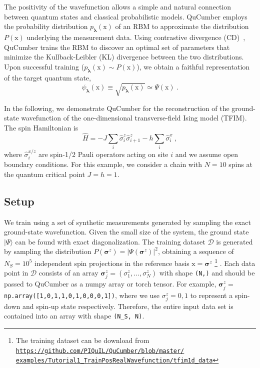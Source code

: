 \documentclass[submission, Phys, hidelnks]{SciPost}
\newcommand{\x}{\bm{\mathrm{x}}}
\begin{document}
The positivity of the wavefunction allows a simple and natural connection between quantum states and classical probabilistic models. QuCumber employs the probability distribution $p_{\bm{\lambda}}(\x)$ of an RBM to approximate the distribution $P(\x)$ underlying the measurement data. Using contrastive divergence (CD)~\cite{hinton2002training}, QuCumber trains the RBM to discover an optimal set of parameters that minimize the Kullback-Leibler (KL) divergence between the two distributions. Upon successful training ($p_{\bm{\lambda}}(\x)\sim P(\x)$), we obtain a faithful representation of the target quantum state,
\begin{equation}\label{wfpd}
    \psi_{\bm{\lambda}}(\x) \equiv \sqrt{p_{\bm{\lambda}}(\x)}
    \simeq\Psi(\x)\:.
\end{equation} 

In the following, we demonstrate QuCumber for the reconstruction of the ground-state wavefunction of the one-dimensional transverse-field Ising model (TFIM). The spin Hamiltonian is 
\begin{equation}
    \hat{H} = -J\sum_i \hat{\sigma}^z_i \hat{\sigma}^z_{i+1} - h \sum_i\hat{\sigma}^x_i\:, \label{TFIM}
\end{equation}
where $\hat{\sigma}^{x/z}_i$ are spin-1/2 Pauli operators acting on site $i$ and we assume open boundary conditions. For this example, we consider a chain with $N=10$ spins at the quantum critical point $J=h=1$.

\subsection{Setup}\label{subsec:example}
We train using a set of synthetic measurements generated by sampling the exact ground-state wavefunction. Given the small size of the system, the ground state $|\Psi\rangle$ can be found with exact diagonalization. The training dataset $\mathcal{D}$ is generated by sampling the distribution $P(\bm{\sigma}^z)=|\Psi(\bm{\sigma}^z)|^2$, obtaining a sequence of $N_S=10^5$ independent spin projections in the reference basis $\x = \bm{\sigma}^z$ 
\footnote{The training dataset can be download from
    \href{https://github.com/PIQuIL/QuCumber/blob/master/examples/Tutorial1_TrainPosRealWavefunction/tfim1d_data.txt}{\texttt{https://github.com/PIQuIL/QuCumber/blob/master/\\examples/Tutorial1\_TrainPosRealWavefunction/tfim1d\_data}}
}
. Each data point in $\mathcal{D}$ consists of an array $\bm{\sigma}^z_j=(\sigma^z_1,\dots,\sigma^z_N)$ with shape \verb|(N,)| and should be passed to QuCumber as a numpy array or torch tensor. For example, $\bm{\sigma}^z_j=$ \verb|np.array([1,0,1,1,0,1,0,0,0,1])|, where we use $\sigma_j^z=0,1$ to represent a spin-down and spin-up state respectively. Therefore, the entire input data set is contained into an array with shape \verb|(N_S, N)|.
\end{document}
